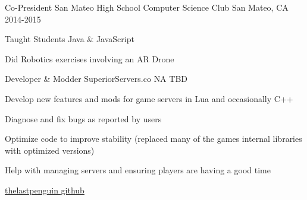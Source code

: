 \begin{cventries}
  \cventry
    {Co-President}
    {San Mateo High School Computer Science Club}
    {San Mateo, CA}
    {2014-2015}
    {
      \begin{cvitems}
        \item {Taught Students Java \& JavaScript}
        \item {Did Robotics exercises involving an AR Drone}
      \end{cvitems}
    }
  \cventry
    {Developer \& Modder}
    {SuperiorServers.co}
    {NA}
    {TBD}
    {
      \begin{cvitems}
        \item {Develop new features and mods for game servers in Lua and occasionally C++}
        \item {Diagnose and fix bugs as reported by users}
        \item {Optimize code to improve stability (replaced many of the games internal libraries with optimized versions)}
        \item {Help with managing servers and ensuring players are having a good time}
        \item \href{https://github.com/thelastpenguin?tab=repositories}{thelastpenguin github}
        \item 
      \end{cvitems}
    }
\end{cventries}
